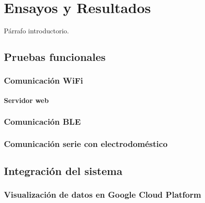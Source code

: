 
\chapter{Ensayos y Resultados} %

\label{Chapter4} %

Párrafo introductorio.

\section{Pruebas funcionales}

\subsection{Comunicación WiFi}

\subsubsection{Servidor web}

\subsection{Comunicación BLE}

\subsection{Comunicación serie con electrodoméstico}

\section{Integración del sistema}

\subsection{Visualización de datos en Google Cloud Platform}